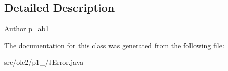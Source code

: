 \subsection{Detailed Description}
\begin{DoxyAuthor}{Author}
p\+\_\+ab1 
\end{DoxyAuthor}


The documentation for this class was generated from the following file\+:\begin{DoxyCompactItemize}
\item 
src/olc2/p1\+\_/J\+Error.\+java\end{DoxyCompactItemize}

